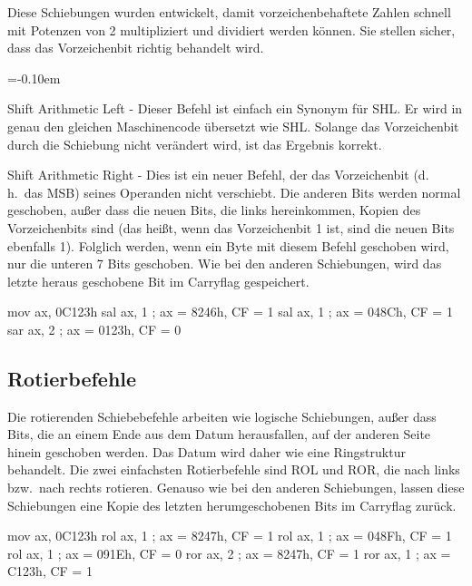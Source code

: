 Diese Schiebungen wurden entwickelt, damit vorzeichenbehaftete
Zahlen schnell mit Potenzen von 2 multipliziert und dividiert werden
k\"{o}nnen. Sie stellen sicher, dass das Vorzeichenbit richtig behandelt
wird.
\begin{description}
\parskip=-0.10em %

\item[SAL]
 Shift Arithmetic Left - Dieser Befehl
ist einfach ein Synonym f\"{u}r {\code SHL}\@. Er wird in genau den
gleichen Maschinencode \"{u}bersetzt wie {\code SHL}\@. Solange das
Vorzeichenbit durch die Schiebung  nicht ver\"{a}ndert wird, ist das
Ergebnis korrekt.

\item[SAR]
 Shift Arithmetic Right - Dies ist ein
neuer Befehl, der das Vorzeichenbit (d.\,h.\ das MSB) seines
Operanden nicht verschiebt. Die anderen Bits werden normal
geschoben, au{\ss}er dass die neuen Bits, die links hereinkommen, Kopien
des Vorzeichenbits sind (das hei{\ss}t, wenn das Vorzeichenbit 1 ist,
sind die neuen Bits ebenfalls 1). Folglich werden, wenn ein Byte mit
diesem Befehl geschoben wird, nur die unteren 7 Bits geschoben. Wie
bei den anderen Schiebungen, wird das letzte heraus geschobene Bit
im Carryflag gespeichert.
\end{description}

\begin{AsmCodeListing}[frame=none, numbers=left, firstnumber=last]
      mov    ax, 0C123h
      sal    ax, 1            ; ax = 8246h, CF = 1
      sal    ax, 1            ; ax = 048Ch, CF = 1
      sar    ax, 2            ; ax = 0123h, CF = 0
\end{AsmCodeListing}

\subsection{Rotierbefehle}

Die rotierenden Schiebebefehle arbeiten wie logische Schiebungen,
au{\ss}er dass Bits, die an einem Ende aus dem Datum herausfallen, auf
der anderen Seite hinein geschoben werden. Das Datum wird daher wie
eine Ringstruktur behandelt. Die zwei einfachsten Rotierbefehle sind
{\code ROL}  und {\code ROR},
 die nach links bzw.\ nach rechts
rotieren. Genauso wie bei den anderen Schiebungen, lassen diese
Schiebungen eine Kopie des letzten herumgeschobenen Bits im
Carryflag zur\"{u}ck.
\begin{AsmCodeListing}[frame=none, numbers=left, firstnumber=last]
      mov    ax, 0C123h
      rol    ax, 1            ; ax = 8247h, CF = 1
      rol    ax, 1            ; ax = 048Fh, CF = 1
      rol    ax, 1            ; ax = 091Eh, CF = 0
      ror    ax, 2            ; ax = 8247h, CF = 1
      ror    ax, 1            ; ax = C123h, CF = 1
\end{AsmCodeListing}

